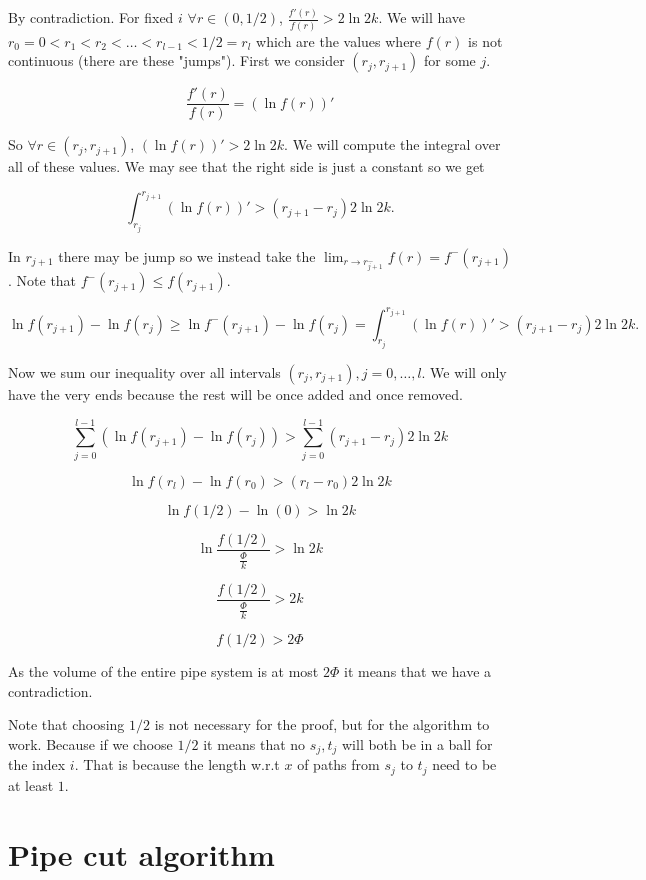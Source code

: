 \begin{myproof}
	By contradiction. For fixed $i$ $\forall r \in (0, 1/2)$, $\frac{f'(r)}{f(r)} > 2 \ln 2k$. We will have $r_{0} = 0 < r_{1} < r_{2} < \dots < r_{l-1} < 1/2 = r_{l}$ which are the values where $f(r)$ is not continuous (there are these "jumps"). First we consider $(r_{j}, r_{j+1})$ for some $j$.
	
	$$
	\frac{f'(r)}{f(r)} = \left( \ln f(r)\right)'
	$$
	
	So $\forall r \in (r_{j}, r_{j+1})$, $\left( \ln f(r)\right)' > 2 \ln 2k$. We will compute the integral over all of these values. We may see that the right side is just a constant so we get
	
	$$
	\int_{r_{j}}^{r_{j+1}} \left( \ln f(r)\right)' > (r_{j+1} - r_{j}) 2 \ln 2k.
	$$
	
	In $r_{j+1}$ there may be jump so we instead take the $\lim_{r \to r_{j+1}^{-}} f(r) = f^{-}(r_{j+1})$. Note that $f^{-}(r_{j+1}) \leq f(r_{j+1})$.
	
	$$
	\ln f(r_{j+1}) - \ln f(r_{j}) \geq \ln f^{-}(r_{j+1}) - \ln f(r_{j}) = \int_{r_{j}}^{r_{j+1}} \left( \ln f(r)\right)' > (r_{j+1} - r_{j}) 2 \ln 2k.
	$$
	
	Now we sum our inequality over all intervals $(r_{j}, r_{j+1}), j = 0, \dots, l$. We will only have the very ends because the rest will be once added and once removed.
	
	$$
	\sum_{j = 0}^{l-1} \left( \ln f(r_{j+1}) - \ln f(r_{j}) \right) > \sum_{j = 0}^{l-1} (r_{j+1} - r_{j}) 2 \ln 2k
	$$
	
	$$
	\ln f(r_{l}) - \ln f(r_{0}) > (r_{l} - r_{0}) 2 \ln 2k
	$$
	
	$$
	\ln f(1/2) - \ln (0) > \ln 2k
	$$
	
	$$
	\ln \frac{f(1/2)}{\frac{\Phi}{k}} > \ln 2k
	$$
	
	$$
	\frac{f(1/2)}{\frac{\Phi}{k}} > 2k
	$$
	
	$$
	f(1/2) > 2 \Phi
	$$
	
	As the volume of the entire pipe system is at most $2 \Phi$ it means that we have a contradiction.
\end{myproof}

Note that choosing $1/2$ is not necessary for the proof, but for the algorithm to work. Because if we choose $1/2$ it means that no $s_{j}, t_{j}$ will both be in a ball for the index $i$. That is because the length w.r.t $x$ of paths from $s_{j}$ to $t_{j}$ need to be at least $1$.

\section{Pipe cut algorithm}

